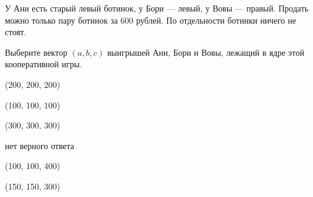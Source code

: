 
\begin{question}
У Ани есть старый левый ботинок, у Бори --- левый, у Вовы --- правый.
Продать можно только пару ботинок за 600 рублей. По отдельности ботинки
ничего не стоят.

Выберите вектор \((a, b, c)\) выигрышей Ани, Бори и Вовы, лежащий в ядре
этой кооперативной игры.
\begin{answerlist}
  \item (200, 200, 200)
  \item (100, 100, 100)
  \item (300, 300, 300)
  \item нет верного ответа
  \item (100, 100, 400)
  \item (150, 150, 300)
\end{answerlist}
\end{question}


